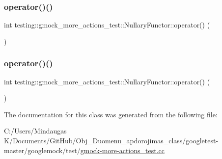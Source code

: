 \mbox{\label{classtesting_1_1gmock__more__actions__test_1_1_nullary_functor_a50f1e39b9ee381693e8bb871acf4e3a9}} 
\subsubsection{\texorpdfstring{operator()()}{operator()()}\hspace{0.1cm}{\footnotesize\ttfamily [2/3]}}
{\footnotesize\ttfamily int testing\+::gmock\+\_\+more\+\_\+actions\+\_\+test\+::\+Nullary\+Functor\+::operator() (\begin{DoxyParamCaption}{ }\end{DoxyParamCaption})\hspace{0.3cm}{\ttfamily [inline]}}

\mbox{\label{classtesting_1_1gmock__more__actions__test_1_1_nullary_functor_a50f1e39b9ee381693e8bb871acf4e3a9}} 
\subsubsection{\texorpdfstring{operator()()}{operator()()}\hspace{0.1cm}{\footnotesize\ttfamily [3/3]}}
{\footnotesize\ttfamily int testing\+::gmock\+\_\+more\+\_\+actions\+\_\+test\+::\+Nullary\+Functor\+::operator() (\begin{DoxyParamCaption}{ }\end{DoxyParamCaption})\hspace{0.3cm}{\ttfamily [inline]}}



The documentation for this class was generated from the following file\+:\begin{DoxyCompactItemize}
\item 
C\+:/\+Users/\+Mindaugas K/\+Documents/\+Git\+Hub/\+Obj\+\_\+\+Duomenu\+\_\+apdorojimas\+\_\+class/googletest-\/master/googlemock/test/\mbox{\hyperlink{googletest-master_2googlemock_2test_2gmock-more-actions__test_8cc}{gmock-\/more-\/actions\+\_\+test.\+cc}}\end{DoxyCompactItemize}
